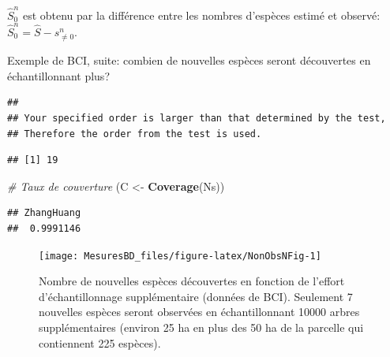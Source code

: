 \documentclass[
  11pt,
  french,
  a4paper,
  extrafontsizes,onecolumn,openright
  ]{memoir}
\newenvironment{Shaded}{\begin{snugshade}}{\end{snugshade}}
\newcommand{\CommentTok}[1]{\textcolor[rgb]{0.56,0.35,0.01}{\textit{#1}}}
\newcommand{\FunctionTok}[1]{\textcolor[rgb]{0.13,0.29,0.53}{\textbf{#1}}}
\newcommand{\NormalTok}[1]{#1}
\newcommand{\OtherTok}[1]{\textcolor[rgb]{0.56,0.35,0.01}{#1}}
\newcommand{\SpecialCharTok}[1]{\textcolor[rgb]{0.81,0.36,0.00}{\textbf{#1}}}
\begin{document}
\(\hat{S}^{n}_{0}\) est obtenu par la différence entre les nombres d'espèces estimé et observé: \(\hat{S}^{n}_{0}=\hat{S}-s^{n}_{\ne 0}\).

Exemple de BCI, suite: combien de nouvelles espèces seront découvertes en échantillonnant plus?

\scriptsize

\begin{Shaded}
\end{Shaded}

\begin{verbatim}
## 
## Your specified order is larger than that determined by the test, 
## Therefore the order from the test is used.
\end{verbatim}

\begin{verbatim}
## [1] 19
\end{verbatim}

\begin{Shaded}
\begin{Highlighting}[]
\CommentTok{\# Taux de couverture}
\NormalTok{(C }\OtherTok{\textless{}{-}} \FunctionTok{Coverage}\NormalTok{(Ns))}
\end{Highlighting}
\end{Shaded}

\begin{verbatim}
## ZhangHuang 
##  0.9991146
\end{verbatim}

\normalsize



\scriptsize

\begin{figure}

{\centering \texttt{[image: MesuresBD\_files/figure-latex/NonObsNFig-1]} 

}

\caption{Nombre de nouvelles espèces découvertes en fonction de l'effort d'échantillonnage supplémentaire (données de BCI). Seulement 7 nouvelles espèces seront observées en échantillonnant 10000 arbres supplémentaires (environ 25 ha en plus des 50 ha de la parcelle qui contiennent 225 espèces).}\label{fig:NonObsNFig}
\end{figure}
\end{document}

